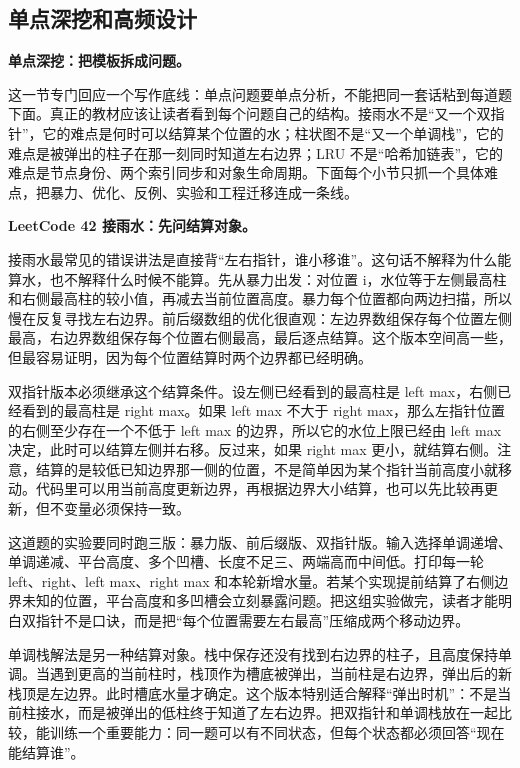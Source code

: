 \subsection{单点深挖和高频设计}

\noindent\textbf{单点深挖：把模板拆成问题。}

这一节专门回应一个写作底线：单点问题要单点分析，不能把同一套话粘到每道题下面。真正的教材应该让读者看到每个问题自己的结构。接雨水不是“又一个双指针”，它的难点是何时可以结算某个位置的水；柱状图不是“又一个单调栈”，它的难点是被弹出的柱子在那一刻同时知道左右边界；LRU 不是“哈希加链表”，它的难点是节点身份、两个索引同步和对象生命周期。下面每个小节只抓一个具体难点，把暴力、优化、反例、实验和工程迁移连成一条线。

\noindent\textbf{LeetCode 42 接雨水：先问结算对象。}

接雨水最常见的错误讲法是直接背“左右指针，谁小移谁”。这句话不解释为什么能算水，也不解释什么时候不能算。先从暴力出发：对位置 i，水位等于左侧最高柱和右侧最高柱的较小值，再减去当前位置高度。暴力每个位置都向两边扫描，所以慢在反复寻找左右边界。前后缀数组的优化很直观：左边界数组保存每个位置左侧最高，右边界数组保存每个位置右侧最高，最后逐点结算。这个版本空间高一些，但最容易证明，因为每个位置结算时两个边界都已经明确。

双指针版本必须继承这个结算条件。设左侧已经看到的最高柱是 left max，右侧已经看到的最高柱是 right max。如果 left max 不大于 right max，那么左指针位置的右侧至少存在一个不低于 left max 的边界，所以它的水位上限已经由 left max 决定，此时可以结算左侧并右移。反过来，如果 right max 更小，就结算右侧。注意，结算的是较低已知边界那一侧的位置，不是简单因为某个指针当前高度小就移动。代码里可以用当前高度更新边界，再根据边界大小结算，也可以先比较再更新，但不变量必须保持一致。

这道题的实验要同时跑三版：暴力版、前后缀版、双指针版。输入选择单调递增、单调递减、平台高度、多个凹槽、长度不足三、两端高而中间低。打印每一轮 left、right、left max、right max 和本轮新增水量。若某个实现提前结算了右侧边界未知的位置，平台高度和多凹槽会立刻暴露问题。把这组实验做完，读者才能明白双指针不是口诀，而是把“每个位置需要左右最高”压缩成两个移动边界。

单调栈解法是另一种结算对象。栈中保存还没有找到右边界的柱子，且高度保持单调。当遇到更高的当前柱时，栈顶作为槽底被弹出，当前柱是右边界，弹出后的新栈顶是左边界。此时槽底水量才确定。这个版本特别适合解释“弹出时机”：不是当前柱接水，而是被弹出的低柱终于知道了左右边界。把双指针和单调栈放在一起比较，能训练一个重要能力：同一题可以有不同状态，但每个状态都必须回答“现在能结算谁”。

